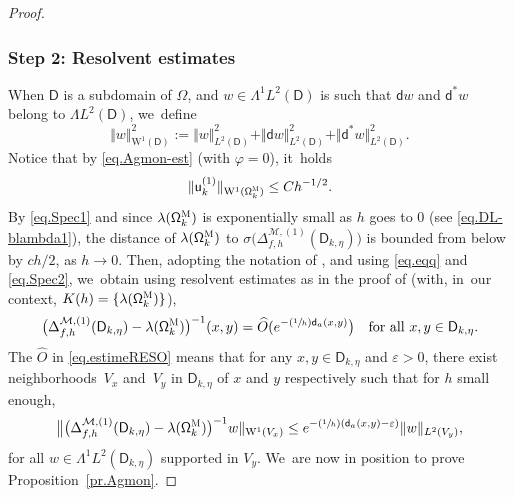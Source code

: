 \documentclass[10pt]{amsart}
\newcommand{\Psfrac}[2]{(\sfrac{#1}{#2})}
\let\epsilon\varepsilon
\theoremstyle{plain}
\theoremstyle{definition}
\begin{document}
\begin{proof}
\subsubsection*{Step 2: Resolvent estimates}
When $\mathsf D$ is a subdomain of $\Omega$, and $w\in \Lambda^1L^2(\mathsf D)$ is such that $ \mathsf d w$ and $\mathsf d^* w$ belong to $\Lambda L^2(\mathsf D)$, we~define
\begin{equation}\label{eq.norm1}
\Vert w\Vert _{\mathrm W^1(\mathsf D)}^2:= \Vert w\Vert _{L^2(\mathsf D)}^2+\Vert \mathsf dw\Vert _{L^2(\mathsf D)}^2+\Vert \mathsf d^*w\Vert _{L^2(\mathsf D)}^2.
\end{equation}
Notice that by \eqref{eq.Agmon-est} (with $\varphi=0$), it~holds
\begin{equation}\label{eq.estimeW1}
\Vert \mathsf u^{(1)}_k \Vert _{\mathrm W^1(\mathsf \Omega_k^{\textsc{M}})}\le Ch^{-1/2}.
\end{equation}
By \eqref{eq.Spec1} and since $\lambda(\mathsf \Omega_k^{\textsc{M}})$ is exponentially small as $h$ goes to $0$ (see \eqref{eq.DL-blambda1}), the distance of $\lambda(\mathsf \Omega_k^{\textsc{M}})$ to $\sigma \bigl(\Delta_{f,h}^{ \mathcal M,(1)} (\mathsf D_{k,\eta})\bigr)$ is bounded from below by $ch/2$, as $h\to 0$.
Then, adopting the notation of
\cite[p.\,56]{DiSj}, and using \eqref{eq.eqq} and \eqref{eq.Spec2}, we~obtain using resolvent estimates as in the proof of
\cite[Prop.\,6.5]{DiSj} (with, in~our context, $K(h)=
\{\lambda(\mathsf \Omega_k^{\textsc{M}}) \}$),
\begin{equation}\label{eq.estimeRESO}
\bigl(\Delta_{f,h}^{ \mathcal M,(1)} (\mathsf D_{k,\eta})- \lambda(\mathsf \Omega_k^{\textsc{M}}) \bigr)^{-1}(x,y)= \widehat O(e^{-\Psfrac 1h \mathsf d_a(x,y)}\bigr) \quad\text{for all } x,y \in \mathsf D_{k,\eta}.
\end{equation}
The $\widehat O$ in \eqref{eq.estimeRESO} means that for any $x,y\in \mathsf D_{k,\eta}$ and $\epsilon>0$, there exist neighborhoods~$V_x$ and~$V_y$ in $\mathsf D_{k,\eta}$ of $x$ and $y$ respectively such that for $h$ small enough,
\[
\big \Vert \bigl(\Delta_{f,h}^{ \mathcal M,(1)} (\mathsf D_{k,\eta})- \lambda(\mathsf \Omega_k^{\textsc{M}}) \bigr)^{-1}w\Vert_{\mathrm W^1(V_x)}\le e^{-\Psfrac 1h (\mathsf d_a(x,y)-\epsilon)}\Vert w\Vert_{L^2(V_y)},
\]
for all $w\!\in\! \Lambda^1L^2(\mathsf D_{k,\eta})$ supported in $V_y$. We~are now in position to prove Proposition~\ref{pr.Agmon}.


\end{proof}
\end{document}
